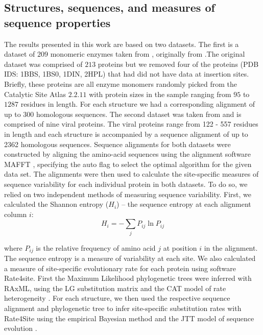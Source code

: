 \documentclass[12pt]{article}
\begin{document}
    \subsection*{Structures, sequences, and measures of sequence properties } 
    The results presented in this work are based on two datasets. The first is a dataset of $209$ monomeric enzymes taken from \cite{Huangetal2014}, originally from \cite{Yehetal2014}.The original dataset was comprised of $213$ proteins but we removed four of the proteins (PDB IDS: 1BBS, 1BS0, 1DIN, 2HPL) that had did not have data at insertion sites. Briefly, these proteins are all enzyme monomers   randomly picked from the Catalytic Site Atlas $2.2.11$ \citep{Porteretal2004} with protein sizes in the sample ranging from $95$ to $1287$ residues in length. For each structure we had a corresponding alignment of up to 300 homologous sequences.  The second dataset was taken from \cite{Shahmoradietal2014} and is comprised of nine viral proteins. The viral proteins range from 122 - 557 residues in length and each structure is accompanied by a sequence alignment of up to 2362 homologous sequences. Sequence alignments for both datasets were constructed by aligning the amino-acid sequences using the alignment software MAFFT \citep{Katohetal2002, Katohetal2005}, specifying the auto flag to select the optimal algorithm for the given data set. The alignments were then used to calculate the site-specific measures of sequence variability for each individual protein in both datasets. To do so, we relied on two independent methods of measuring sequence variability. First, we calculated the Shannon entropy ($H_i$) -- the sequence entropy at each alignment column $i$:
    \begin{equation}
        \label{eqn:shannon}
        H_i = -\sum_j P_{ij}\ln P_{ij}
    \end{equation}

    where $P_{ij}$ is the relative frequency of amino acid $j$ at position $i$ in the alignment. The sequence entropy is a measure of variability at each site. We also calculated a measure of site-specific evolutionary rate for each protein using software Rate4site. First the Maximum Likelihood phylogenetic trees were inferred with RAxML, using the LG substitution matrix and the CAT model of rate heterogeneity \citep{Stamatakis2006, Stamatakis2014}. For each structure, we then used the respective sequence alignment and phylogenetic tree to infer site-specific substitution rates with Rate4Site using the empirical Bayesian method and the JTT model of sequence evolution \citep{Mayroseetal2004}.
\end{document}
